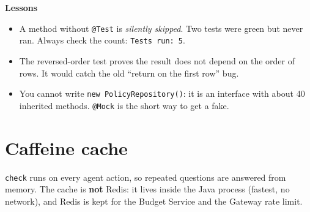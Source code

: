 \documentclass[11pt,a4paper]{article}
\newcommand{\code}[1]{\texttt{\small #1}}
\begin{document}
\textbf{Lessons}
\begin{itemize}
  \item A method without \code{@Test} is \emph{silently skipped}. Two tests were green but never ran. Always check the count: \code{Tests run: 5}.
  \item The reversed-order test proves the result does not depend on the order of rows. It would catch the old ``return on the first row'' bug.
  \item You cannot write \code{new PolicyRepository()}: it is an interface with about 40 inherited methods. \code{@Mock} is the short way to get a fake.
\end{itemize}

\section{Caffeine cache}

\code{check} runs on every agent action, so repeated questions are answered from memory.
The cache is \textbf{not} Redis: it lives inside the Java process (fastest, no network),
and Redis is kept for the Budget Service and the Gateway rate limit.

\begin{center}
\end{center}
\end{document}
